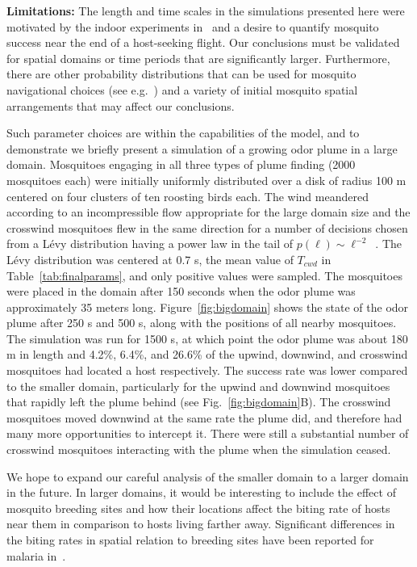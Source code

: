 \documentclass[10pt]{article}
\begin{document}
\textbf{Limitations:}
The length and time scales in the simulations presented here were motivated by the indoor experiments in~\cite{Foppa2011} and a desire to quantify mosquito success near the end of a host-seeking flight. Our conclusions must be validated for spatial domains or time periods that are significantly larger. Furthermore, there are other probability distributions that can be used for mosquito navigational choices (see e.g.~\cite{Pasternak2009}) and a variety of initial mosquito spatial arrangements that may affect our conclusions. 

Such parameter choices are within the capabilities of the model, and to demonstrate we briefly present a simulation of a growing odor plume in a large domain. Mosquitoes engaging in all three types of plume finding (2000 mosquitoes each) were initially uniformly distributed over a disk of radius 100 m centered on four clusters of ten roosting birds each. The wind meandered according to an incompressible flow appropriate for the large domain size and the crosswind mosquitoes flew in the same direction for a number of decisions chosen from a L\'{e}vy distribution having a power law in the tail of $p(\ell) \sim \ell^{-2}$~\cite{ReynoldsFrye2007}. The L\'{e}vy distribution was centered at 0.7 s, the mean value of $T_{cwd}$ in Table~\ref{tab:finalparams}, and only positive values were sampled. The mosquitoes were placed in the domain after 150 seconds when the odor plume was approximately 35 meters long. Figure~\ref{fig:bigdomain} shows the state of the odor plume after 250 s and 500 s, along with the positions of all nearby mosquitoes. The simulation was run for 1500 s, at which point the odor plume was about 180 m in length and 4.2\%, 6.4\%, and 26.6\% of the upwind, downwind, and crosswind mosquitoes had located a host respectively. The success rate was lower compared to the smaller domain, particularly for the upwind and downwind mosquitoes that rapidly left the plume behind (see Fig.~\ref{fig:bigdomain}B). The crosswind mosquitoes moved downwind at the same rate the plume did, and therefore had many more opportunities to intercept it. There were still a substantial number of crosswind mosquitoes interacting with the plume when the simulation ceased. 

We hope to expand our careful analysis of the smaller domain to a larger domain in the future.
In larger domains, it would be interesting to include the effect of mosquito breeding sites and how their locations affect the biting rate of hosts near them in comparison to hosts living farther away. Significant differences in the biting rates in spatial relation to breeding sites have been reported for malaria in~\cite{ThompsonEtAl1997}.  
\end{document}

